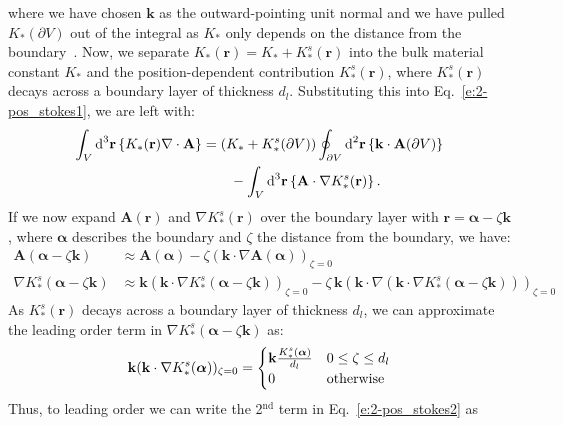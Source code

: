 where we have chosen $\mathbf{k}$ as the outward-pointing unit normal and we have pulled $K_*(\partial V)$ out of the integral as $K_*$ only depends on the distance from the boundary~\cite{RN55}.
Now, we separate $K_*(\mathbf{r}) = K_* + K_*^s(\mathbf{r})$ into the bulk material constant $K_*$ and the position-dependent contribution $K_*^s(\mathbf{r})$, where $K_*^s(\mathbf{r})$ decays across a boundary layer of thickness $d_l$.
Substituting this into Eq.~\ref{e:2-pos_stokes1}, we are left with:
\begin{align}
  \int_{V}\textup{d}^3\mathbf{r} \left \{ K_{*} (\mathbf{r}) \nabla \cdot \mathbf{A} \right \} &=
  (K_*+K_*^s(\partial V)) \oint_{\partial V} \textup{d}^2\mathbf{r} \left \{ \mathbf{k} \cdot \mathbf{A}(\partial V)\right \} \nonumber \\&
  \quad \quad - \int_{V} \textup{d}^3\mathbf{r} \left \{ \mathbf{A} \cdot \nabla K_{*}^s (\mathbf{r}) \right \}. \label{e:2-pos_stokes2}
\end{align}
If we now expand $\mathbf{A}(\mathbf{r})$ and $\nabla K_*^s(\mathbf{r})$ over the boundary layer with $\mathbf{r} = \bm{\alpha} - \zeta \mathbf{k}$, where $\bm{\alpha}$ describes the boundary and $\zeta$ the distance from the boundary, we have:
\begin{align}
  \mathbf{A}(\bm{\alpha} - \zeta \mathbf{k}) &\approx \mathbf{A}(\bm{\alpha}) - \zeta (\mathbf{k} \cdot \nabla \mathbf{A}(\bm{\alpha}))_{\zeta = 0} \label{e:2-expandA} \\
  \nabla K_*^s(\bm{\alpha} - \zeta \mathbf{k}) &\approx \mathbf{k} (\mathbf{k} \cdot \nabla K_*^s(\bm{\alpha} - \zeta \mathbf{k}))_{\zeta = 0} - \zeta\, \mathbf{k}(\mathbf{k} \cdot \nabla (\mathbf{k} \cdot \nabla K_*^s(\bm{\alpha} - \zeta \mathbf{k})))_{\zeta = 0}
\end{align}
As $K_*^s(\mathbf{r})$ decays across a boundary layer of thickness $d_l$, we can approximate the leading order term in $\nabla K_*^s(\bm{\alpha} - \zeta \mathbf{k})$ as:
\begin{equation}
  \mathbf{k} (\mathbf{k} \cdot \nabla K_*^s(\bm{\alpha}))_{\zeta = 0} =
  \begin{cases}
    \mathbf{k}\frac{K_*^s(\bm{\alpha})}{d_l} & 0 \leq \zeta \leq d_l \\
    0 & \textup{otherwise}
  \end{cases}
\end{equation}
Thus, to leading order we can write the 2$^\textrm{nd}$ term in Eq.~\ref{e:2-pos_stokes2} as
